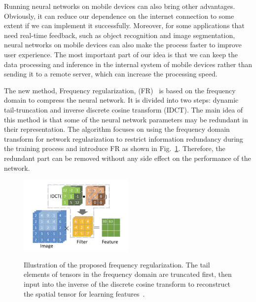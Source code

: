 \documentclass{article}
\begin{document}
Running neural networks on mobile devices can also bring other advantages. Obviously, it can reduce our dependence on the internet connection to some extent if we can implement it successfully. Moreover, for some applications that need real-time feedback, such as object recognition and image segmentation, neural networks on mobile devices can also make the process faster to improve user experience. The most important part of our idea is that we can keep the data processing and inference in the internal system of mobile devices rather than sending it to a remote server, which can increase the processing speed.

The new method, Frequency regularization, (FR)~\cite{zhao2023frequency} is based on the frequency domain to compress the neural network. It is divided into two steps: dynamic tail-truncation and inverse discrete cosine transform (IDCT). The main idea of this method is that some of the neural network parameters may be redundant in their representation. The algorithm focuses on using the frequency domain transform for network regularization to restrict information redundancy during the training process and introduce FR as shown in Fig.~\ref{idct}. Therefore, the redundant part can be removed without any side effect on the performance of the network.


\begin{figure}
	\vspace{-15pt}    %
	\includegraphics[width=0.5\textwidth]{figure/idct.png}\\
	\vspace{-15pt}    %
	\caption{Illustration of the proposed frequency regularization. The tail elements of tensors in the frequency domain are truncated first, then input into the inverse of the discrete cosine transform to reconstruct the spatial tensor for learning features~\cite{zhao2023frequency}.}
	\label{idct}
	\vspace{-15pt}    %
\end{figure}
\end{document}
